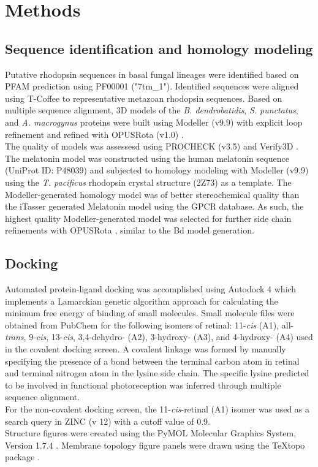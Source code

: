 \section{Methods}
\subsection*{Sequence identification and homology modeling}
Putative rhodopsin sequences in basal fungal lineages were identified based on PFAM prediction using PF00001 ("7tm\_1"). Identified sequences were aligned using T-Coffee to representative metazoan rhodopsin sequences. Based on multiple sequence alignment, 3D models of the \textit{B. dendrobatidis}, \textit{S. punctatus}, and \textit{A. macrogynus} proteins were built using Modeller (v9.9) \cite{Eswar2007} with explicit loop refinement and refined with OPUSRota (v1.0) \cite{Lu2008}.\\ 
\indent The quality of models was assessesd using PROCHECK (v3.5) \cite{Laskowski1993,Wiederstein2007} and Verify3D \cite{Luthy1992}. The melatonin model was constructed using the human melatonin sequence (UniProt ID: P48039) and subjected to homology modeling with Modeller (v9.9) \cite{Eswar2007} using the \textit{T. pacificus} rhodopsin crystal structure (2Z73) as a template. The Modeller-generated homology model was of better stereochemical quality than the iTasser generated Melatonin model using the GPCR database. As such, the highest quality Modeller-generated model was selected for further side chain refinements with OPUSRota \cite{Lu2008}, similar to the Bd model generation.\\
\subsection*{Docking}
\indent Automated protein-ligand docking was accomplished using Autodock 4 \cite{Morris2009} which implements a Lamarckian genetic algorithm approach for calculating the minimum free energy of binding of small molecules. Small molecule files were obtained from PubChem \cite{Bolton2008} for the following isomers of retinal: 11-\textit{cis} (A1), all-\textit{trans}, 9-\textit{cis}, 13-\textit{cis}, 3,4-dehydro- (A2), 3-hydroxy- (A3), and 4-hydroxy- (A4) used in the covalent docking screen. A covalent linkage was formed by manually specifying the presence of a bond between the terminal carbon atom in retinal and terminal nitrogen atom in the lysine side chain. The specific lysine predicted to be involved in functional photoreception was inferred through multiple sequence alignment.\\
\indent For the non-covalent docking screen, the 11-\textit{cis}-retinal (A1) isomer was used as a search query in ZINC (v 12) \cite{Irwin2005} with a cutoff value of 0.9.\\
\indent Structure figures were created using the PyMOL Molecular Graphics System, Version 1.7.4 \cite{PyMOL}. Membrane topology figure panels were drawn using the {\TeX}topo package \cite{Beitz2000textopo}.\\

